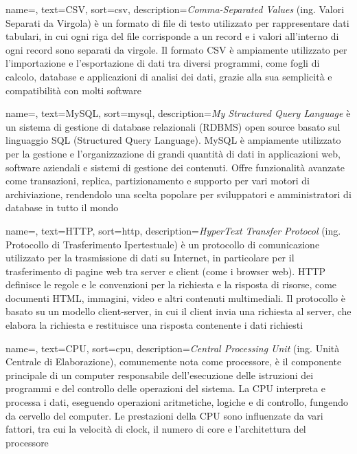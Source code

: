  {
    name=,
    text=CSV,
    sort=csv,
    description={\emph{Comma-Separated Values} (ing. Valori Separati da Virgola) è un formato di file di testo utilizzato per rappresentare dati tabulari, in cui ogni riga del file corrisponde a un record e i valori all'interno di ogni record sono separati da virgole. Il formato CSV è ampiamente utilizzato per l'importazione e l'esportazione di dati tra diversi programmi, come fogli di calcolo, database e applicazioni di analisi dei dati, grazie alla sua semplicità e compatibilità con molti software}
}

 {
    name=,
    text=MySQL,
    sort=mysql,
    description={\emph{My Structured Query Language} è un sistema di gestione di database relazionali (RDBMS) open source basato sul linguaggio SQL (Structured Query Language). MySQL è ampiamente utilizzato per la gestione e l'organizzazione di grandi quantità di dati in applicazioni web, software aziendali e sistemi di gestione dei contenuti. Offre funzionalità avanzate come transazioni, replica, partizionamento e supporto per vari motori di archiviazione, rendendolo una scelta popolare per sviluppatori e amministratori di database in tutto il mondo}
}

 {
    name=,
    text=HTTP,
    sort=http,
    description={\emph{HyperText Transfer Protocol} (ing. Protocollo di Trasferimento Ipertestuale) è un protocollo di comunicazione utilizzato per la trasmissione di dati su Internet, in particolare per il trasferimento di pagine web tra server e client (come i browser web). HTTP definisce le regole e le convenzioni per la richiesta e la risposta di risorse, come documenti HTML, immagini, video e altri contenuti multimediali. Il protocollo è basato su un modello client-server, in cui il client invia una richiesta al server, che elabora la richiesta e restituisce una risposta contenente i dati richiesti}
}

 {
    name=,
    text=CPU,
    sort=cpu,
    description={\emph{Central Processing Unit} (ing. Unità Centrale di Elaborazione), comunemente nota come processore, è il componente principale di un computer responsabile dell'esecuzione delle istruzioni dei programmi e del controllo delle operazioni del sistema. La CPU interpreta e processa i dati, eseguendo operazioni aritmetiche, logiche e di controllo, fungendo da cervello del computer. Le prestazioni della CPU sono influenzate da vari fattori, tra cui la velocità di clock, il numero di core e l'architettura del processore}
}